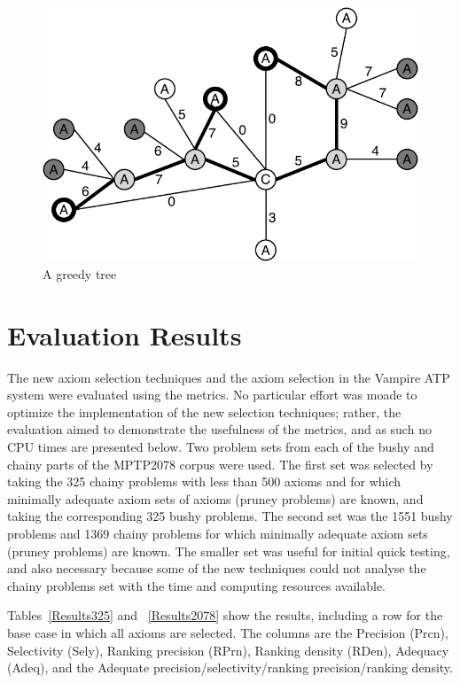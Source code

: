 \documentclass[EPiC]{easychair}
\begin{document}
\begin{figure}[h]
\centering
\includegraphics[width=0.5\linewidth]{GreedyTree+NN.pdf}
\caption{A greedy tree}
\label{GreedyTree}
\end{figure}

\section{Evaluation Results}
\label{Results}

The new axiom selection techniques and the axiom selection in the Vampire 
ATP system were evaluated using the metrics.
No particular effort was moade to optimize the implementation of the new
selection techniques; rather, the evaluation aimed to demonstrate the
usefulness of the metrics, and as such no CPU times are presented below.
Two problem sets from each of the bushy and chainy parts of the MPTP2078 
corpus were used. 
The first set was selected by taking the 325 chainy problems with less than 
500 axioms and for which minimally adequate axiom sets of axioms (pruney 
problems) are known, and taking the corresponding 325 bushy problems.
The second set was the 1551 bushy problems and 1369 chainy problems for which
minimally adequate axiom sets (pruney problems) are known.
The smaller set was useful for initial quick testing, and also necessary 
because some of the new techniques could not analyse the chainy problems set 
with the time and computing resources available.

Tables~\ref{Results325} and ~\ref{Results2078} show the results, including
a row for the base case in which all axioms are selected.
The columns are the 
Precision (Prcn), 
Selectivity (Sely), 
Ranking precision (RPrn), 
Ranking density (RDen), 
Adequacy (Adeq),
and the Adequate precision/selectivity/ranking precision/ranking density.
\end{document}
